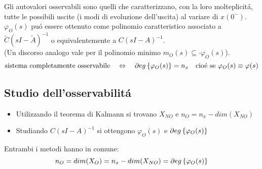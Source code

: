 \documentclass[../main.tex]{subfiles}
\begin{document}
		Gli autovalori osservabili sono quelli che caratterizzano, con la loro molteplicit\'a, tutte le possibili uscite (i modi di evoluzione dell'uscita) al variare di $ x(0^{-}) $. $ \varphi_O(s) $ pu\'o essere ottenuto come polinomio caratteristico associato a $ \tilde C (sI-\tilde A)^{-1} $ o equivalentemente a $ C(sI-A)^{-1} $.\\
		(Un discorso analogo vale per il polinomio minimo $ m_O(s) \subseteq \cdot \varphi_O(s) $).
		\[
			\text{sistema completamente osservabile} \quad\Leftrightarrow\quad \partial eg \left\lbrace \varphi_O(s) \right\rbrace = n_x \quad\text{cio\'e se}\ \varphi_O(s) \equiv \varphi(s)
		\]
		
	\subsection{Studio dell'osservabilit\'a}
		\begin{itemize}
			\item 
				Utilizzando il teorema di Kalmann si trovano $ X_{NO} $ e $ n_O = n_x - dim(X_{NO}) $
			\item 
				Studiando $ C(sI-A)^{-1} $ si ottengono $ \varphi_O(s) $ e $ \partial eg \left\lbrace \varphi_O(s) \right\rbrace $
		\end{itemize}
		Entrambi i metodi hanno in comune:
		\[
			n_O = dim(X_O) = n_x - dim(X_{NO}) = \partial eg \left\lbrace \varphi_O(s) \right\rbrace
		\]
		
\end{document}
